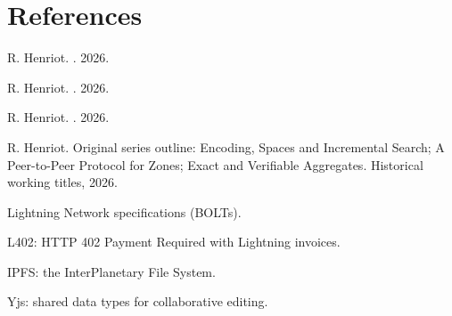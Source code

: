 \documentclass[11pt]{article}
\begin{document}
\section*{References}
\begin{enumerate}[label={[\arabic*]},leftmargin=2em,itemsep=1pt]
\item \hypertarget{reference:1}{}R. Henriot. . 2026.
\item \hypertarget{reference:2}{}R. Henriot. . 2026.
\item \hypertarget{reference:3}{}R. Henriot. . 2026.
\item \hypertarget{reference:4}{}R. Henriot. Original series outline: Encoding, Spaces and Incremental Search; A Peer-to-Peer Protocol for Zones; Exact and Verifiable Aggregates. Historical working titles, 2026.
\item \hypertarget{reference:5}{}Lightning Network specifications (BOLTs).
\item \hypertarget{reference:6}{}L402: HTTP 402 Payment Required with Lightning invoices.
\item \hypertarget{reference:7}{}IPFS: the InterPlanetary File System.
\item \hypertarget{reference:8}{}Yjs: shared data types for collaborative editing.
\end{enumerate}
\end{document}
